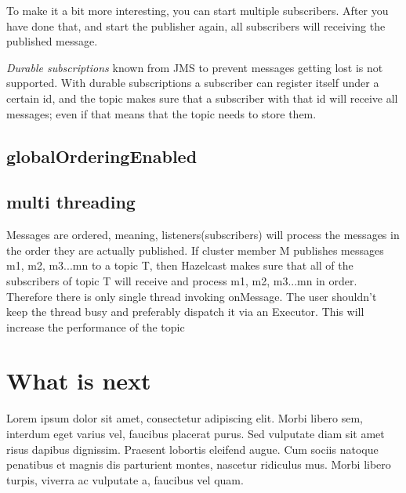 To make it a bit more interesting, you can start multiple subscribers. After you have done that, and start the publisher again, all subscribers will receiving the published message.

\emph{Durable subscriptions} known from JMS to prevent messages getting lost is not supported. With durable subscriptions a subscriber can register itself under a certain id, and the topic makes sure that a subscriber with that id will receive all messages; even if that means that the topic needs to store them.

\subsection{globalOrderingEnabled}

\subsection{multi threading}
Messages are ordered, meaning, listeners(subscribers) will process the messages in the order they are actually published. If cluster member M publishes messages m1, m2, m3...mn to a topic T, then Hazelcast makes sure that all of the subscribers of topic T will receive and process m1, m2, m3...mn in order. Therefore there is only single thread invoking onMessage. The user shouldn't keep the thread busy and preferably dispatch it via an Executor. This will increase the performance of the topic

\section{What is next}
Lorem ipsum dolor sit amet, consectetur adipiscing elit. Morbi libero sem,
interdum eget varius vel, faucibus placerat purus. Sed vulputate diam sit amet
risus dapibus dignissim. Praesent lobortis eleifend augue. Cum sociis natoque
penatibus et magnis dis parturient montes, nascetur ridiculus mus. Morbi libero
turpis, viverra ac vulputate a, faucibus vel quam.

